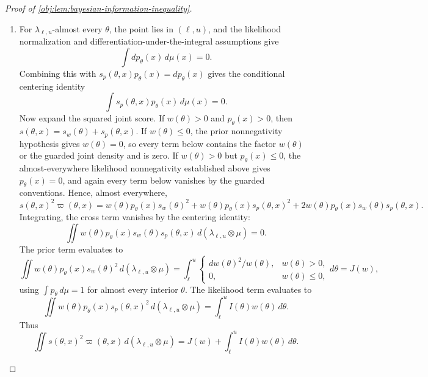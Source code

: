 \documentclass[11pt]{article}
\begin{document}
\begin{proof}[Proof of \cref{obj:lem:bayesian-information-inequality}]
\begin{enumerate}
\item For \(\lambda_{\ell,u}\)-almost every \(\theta\), the point lies in \((\ell,u)\), and
the likelihood normalization and differentiation-under-the-integral assumptions give
\[
\int dp_\theta(x)\,d\mu(x)=0.
\]
Combining this with \(s_p(\theta,x)p_\theta(x)=dp_\theta(x)\) gives the conditional
centering identity
\[
\int s_p(\theta,x)p_\theta(x)\,d\mu(x)=0.
\]
Now expand the squared joint score.  If \(w(\theta)>0\) and \(p_\theta(x)>0\), then
\(s(\theta,x)=s_w(\theta)+s_p(\theta,x)\).  If \(w(\theta)\le0\), the prior
nonnegativity hypothesis gives \(w(\theta)=0\), so every term below contains the factor
\(w(\theta)\) or the guarded joint density and is zero.  If \(w(\theta)>0\) but
\(p_\theta(x)\le0\), the almost-everywhere likelihood nonnegativity established above
gives \(p_\theta(x)=0\), and again every term below vanishes by the guarded conventions.
Hence, almost everywhere,
\[
s(\theta,x)^2\varpi(\theta,x)
 =
w(\theta)p_\theta(x)s_w(\theta)^2
 +
w(\theta)p_\theta(x)s_p(\theta,x)^2
 +
2w(\theta)p_\theta(x)s_w(\theta)s_p(\theta,x).
\]
Integrating, the cross term vanishes by the centering identity:
\[
\iint w(\theta)p_\theta(x)s_w(\theta)s_p(\theta,x)\,
d(\lambda_{\ell,u}\otimes\mu)=0.
\]
The prior term evaluates to
\[
\iint w(\theta)p_\theta(x)s_w(\theta)^2\,d(\lambda_{\ell,u}\otimes\mu)
 =
\int_\ell^u
\begin{cases}
dw(\theta)^2/w(\theta),& w(\theta)>0,\\
0,& w(\theta)\le0,
\end{cases}
d\theta
 =
J(w),
\]
using \(\int p_\theta\,d\mu=1\) for almost every interior \(\theta\).  The likelihood
term evaluates to
\[
\iint w(\theta)p_\theta(x)s_p(\theta,x)^2\,d(\lambda_{\ell,u}\otimes\mu)
 =
\int_\ell^u I(\theta)w(\theta)\,d\theta.
\]
Thus
\[
\iint s(\theta,x)^2\varpi(\theta,x)\,d(\lambda_{\ell,u}\otimes\mu)
 =
J(w)+\int_\ell^u I(\theta)w(\theta)\,d\theta.
\] %


\end{enumerate}
\end{proof}
\end{document}
